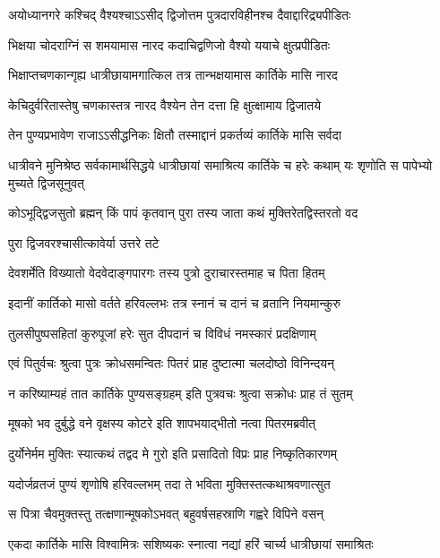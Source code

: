 \twolineshloka
{अयोध्यानगरे कश्चिद् वैश्यश्चाऽऽसीद् द्विजोत्तम}
{पुत्रदारविहीनश्च दैवाद्दारिद्र्यपीडितः} %

\twolineshloka
{भिक्षया चोदराग्निं स शमयामास नारद}
{कदाचिद्वणिजो वैश्यो ययाचे क्षुत्प्रपीडितः} %

\twolineshloka
{भिक्षाप्तचणकान्गृह्य धात्रीछायामगात्किल}
{तत्र तान्भक्षयामास कार्तिके मासि नारद} %

\twolineshloka
{केचिदुर्वरितास्तेषु चणकास्तत्र नारद}
{वैश्येन तेन दत्ता हि क्षुत्क्षामाय द्विजातये} %

\twolineshloka
{तेन पुण्यप्रभावेण राजाऽऽसीद्धनिकः क्षितौ}
{तस्माद्दानं प्रकर्तव्यं कार्तिके मासि सर्वदा} %

\threelineshloka
{धात्रीवने मुनिश्रेष्ठ सर्वकामार्थसिद्धये}
{धात्रीछायां समाश्रित्य कार्तिके च हरेः कथाम्}
{यः शृणोति स पापेभ्यो मुच्यते द्विजसूनुवत्} %

\twolineshloka
{कोऽभूद्द्विजसुतो ब्रह्मन् किं पापं कृतवान् पुरा}
{तस्य जाता कथं मुक्तिरेतद्विस्तरतो वद} %



\onelineshloka
{पुरा द्विजवरश्चासीत्कावेर्या उत्तरे तटे} %

\twolineshloka
{देवशर्मेति विख्यातो वेदवेदाङ्गपारगः}
{तस्य पुत्रो दुराचारस्तमाह च पिता हितम्} %

\twolineshloka
{इदानीं कार्तिको मासो वर्तते हरिवल्लभः}
{तत्र स्नानं च दानं च व्रतानि नियमान्कुरु} %

\twolineshloka
{तुलसीपुष्पसहितां कुरुपूजां हरेः सुत}
{दीपदानं च विविधं नमस्कारं प्रदक्षिणाम्} %

\twolineshloka
{एवं पितुर्वचः श्रुत्वा पुत्रः क्रोधसमन्वितः}
{पितरं प्राह दुष्टात्मा चलदोष्ठो विनिन्दयन्} %


\twolineshloka
{न करिष्याम्यहं तात कार्तिके पुण्यसङ्ग्रहम्}
{इति पुत्रवचः श्रुत्वा सक्रोधः प्राह तं सुतम्} %

\twolineshloka
{मूषको भव दुर्बुद्धे वने वृक्षस्य कोटरे}
{इति शापभयाद्भीतो नत्वा पितरमब्रवीत्} %

\twolineshloka
{दुर्योनेर्मम मुक्तिः स्यात्कथं तद्वद मे गुरो}
{इति प्रसादितो विप्रः प्राह निष्कृतिकारणम्} %

\twolineshloka
{यदोर्जव्रतजं पुण्यं शृणोषि हरिवल्लभम्}
{तदा ते भविता मुक्तिस्तत्कथाश्रवणात्सुत} %

\twolineshloka
{स पित्रा चैवमुक्तस्तु तत्क्षणान्मूषकोऽभवत्}
{बहुवर्षसहस्राणि गह्वरे विपिने वसन्} %

\twolineshloka
{एकदा कार्तिके मासि विश्वामित्रः सशिष्यकः}
{स्नात्वा नद्यां हरिं चार्च्य धात्रीछायां समाश्रितः} %

